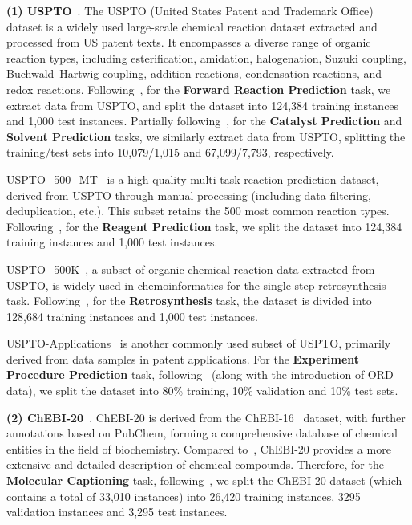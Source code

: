 \noindent\textbf{(1) USPTO}~\cite{USPTO2020}.
The USPTO (United States Patent and Trademark Office) dataset is a widely used large-scale chemical reaction dataset extracted and processed from US patent texts. It encompasses a diverse range of organic reaction types, including esterification, amidation, halogenation, Suzuki coupling, Buchwald–Hartwig coupling, addition reactions, condensation reactions, and redox reactions. Following~\citet{fang2024molinstructions}, for the \textbf{Forward Reaction Prediction} task, we extract data from USPTO, and split the dataset into 124,384 training instances and 1,000 test instances. Partially following~\citet{cao-etal-2024-presto}, for the \textbf{Catalyst Prediction} and \textbf{Solvent Prediction} tasks, we similarly extract data from USPTO, splitting the training/test sets into 10,079/1,015 and 67,099/7,793, respectively. 

USPTO\_500\_MT~\cite{lu2022unified} is a high-quality multi-task reaction prediction dataset, derived from USPTO through manual processing (including data filtering, deduplication, etc.). This subset retains the 500 most common reaction types. Following~\citet{fang2024molinstructions}, for the \textbf{Reagent Prediction} task, we split the dataset into 124,384 training instances and 1,000 test instances. 

USPTO\_500K~\cite{lu2022unified}, a subset of organic chemical reaction data extracted from USPTO, is widely used in chemoinformatics for the single-step retrosynthesis task. Following~\citet{fang2024molinstructions}, for the \textbf{Retrosynthesis} task, the dataset is divided into 128,684 training instances and 1,000 test instances.

USPTO-Applications~\cite{Lowe2017} is another commonly used subset of USPTO, primarily derived from data samples in patent applications. For the \textbf{Experiment Procedure Prediction} task, following~\citet{liu2024reactxt} (along with the introduction of ORD data), we split the dataset into 80\% training, 10\% validation and 10\% test sets.


\noindent\textbf{(2) ChEBI-20}~\cite{edwards2021text2mol}.
ChEBI-20 is derived from the ChEBI-16~\cite{hastings2016chebi} dataset, with further annotations based on PubChem, forming a comprehensive database of chemical entities in the field of biochemistry. Compared to~\citet{fang2024molinstructions}, ChEBI-20 provides a more extensive and detailed description of chemical compounds. Therefore, for the \textbf{Molecular Captioning} task, following~\citet{cao2023instructmol}, we split the ChEBI-20 dataset (which contains a total of 33,010 instances) into 26,420 training instances, 3295 validation instances and 3,295 test instances.

